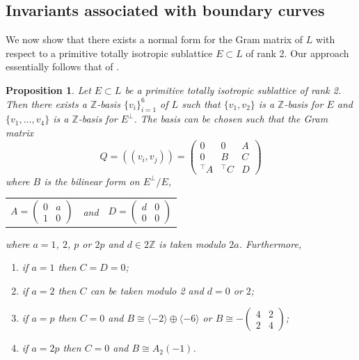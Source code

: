 \documentclass[11pt]{article}
\newtheorem{prop}[thm]{Proposition}
\newcommand{\ZZ}{\mathbb{Z}}
\newcommand{\la}{\langle}
\newcommand{\ra}{\rangle}
\newcommand{\bsm}{\left ( \begin{smallmatrix} }
\newcommand{\esm}{\end{smallmatrix} \right )}
\newcommand{\op}{\oplus}
\newcommand{\bpm}{\begin{pmatrix}}
\newcommand{\epm}{\end{pmatrix}}
\begin{document}
\subsection{Invariants associated with boundary curves}
We now show that there exists a normal form for the Gram matrix of $L$ with respect to a primitive totally isotropic sublattice $E \subset L$ of rank 2.
Our approach essentially follows that of \cite{Scattone}.
\begin{prop}\label{normformprop}
  Let $E \subset L$ be a primitive totally isotropic sublattice of rank 2. Then there exists a $\ZZ$-basis $\{v_i \}_{i=1}^6$ of $L$ such that $\{v_1, v_2 \}$ is a $\ZZ$-basis for $E$ and $\{v_1, \ldots, v_4 \}$ is a $\ZZ$-basis for $E^{\perp}$.
  The basis can be chosen such that the Gram matrix
  \begin{equation}\label{eqnform}
    Q
    =
    ((v_i, v_j))
    =
    \bpm
    0 & 0 & A \\
    0 & B & C \\
    {^{\intercal}}A & {^{\intercal}}C & D
    \epm
  \end{equation}
    where    $B$ is the bilinear form on $E^{\perp}/E$,
    \begin{center}
        \begin{tabular}{c c c}
          $A = \bpm 0 & a \\ 1 & 0 \epm$
          & and &
          $D = \bpm d & 0 \\ 0 & 0 \epm$
        \end{tabular}
        \end{center}
    where $a = 1$, $2$, $p$ or $2p$ and $d \in 2 \ZZ$ is taken modulo $2a$.
    Furthermore,
    \begin{enumerate}
    \item if $a=1$ then $C=D=0$;
    \item if $a=2$ then $C$ can be taken modulo 2 and $d=0$ or $2$;
    \item if $a=p$ then $C=0$ and $B \cong \la -2 \ra \op \la -6 \ra$ or $B \cong -\bsm 4 & 2 \\ 2 & 4 \esm$;
    \item if $a=2p$ then $C=0$ and $B \cong A_2(-1)$.
    \end{enumerate}
  \end{prop}
\end{document}
